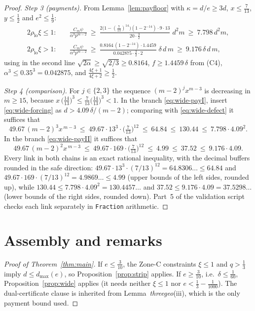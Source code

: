 \documentclass[11pt]{amsart}
\begin{document}
\begin{proof}
\emph{Step 3 (payments).}  From Lemma~\ref{lem:payfloor} with
$\kappa=d/e\ge3d$, $x\le\tfrac7{13}$, $y\le\tfrac12$ and $e^2\le\tfrac19$:
\begin{align}
 2\rho_{\mathrm{lo}}\xi\le1:\quad
 &\frac{C_m\psi}{\alpha^3p^{m-2}}\ \ge\
 \frac{2\bigl(1-(\tfrac7{13})^{14}\bigr)(1-2^{-14})\cdot9\cdot13}
      {20\cdot\tfrac32}\;d^2m\ \ge\ 7.798\,d^2m,
 \label{eq:wide-payI}\\
 2\rho_{\mathrm{lo}}\xi>1:\quad
 &\frac{C_m\psi}{\alpha^3p^{m-2}}\ \ge\
 \frac{0.8164\,(1-2^{-14})\cdot1.4459}
      {0.042875\cdot\tfrac32\cdot2}\;\delta\,d\,m\ \ge\ 9.176\,\delta\,d\,m,
 \label{eq:wide-payII}
\end{align}
using in the second line $\sqrt{2\alpha}\ge\sqrt{2/3}\ge0.8164$,
$f\ge1.4459\,\delta$ from (C4), $\alpha^3\le0.35^3=0.042875$, and
$\tfrac{4\xi+1}{4\xi+2}\ge\tfrac12$.

\emph{Step 4 (comparison).}  For $j\in\{2,3\}$ the sequence
$(m-2)^jx^{m-3}$ is decreasing in $m\ge15$, because
$x\,\bigl(\tfrac{14}{13}\bigr)^3\le\tfrac7{13}\bigl(\tfrac{14}{13}\bigr)^3
<1$.  In the branch \eqref{eq:wide-payI}, insert
\eqref{eq:wide-forcing} as $d>4.09\,\delta/(m-2)$; comparing with
\eqref{eq:wide-defect} it suffices that
\[
 49.67\,(m-2)^3x^{\,m-3}\ \le\ 49.67\cdot13^3\cdot
 \bigl(\tfrac7{13}\bigr)^{12}\ \le\ 64.84\ \le\ 130.44\ \le\
 7.798\cdot4.09^2 .
\]
In the branch \eqref{eq:wide-payII} it suffices that
\[
 49.67\,(m-2)^2x^{\,m-3}\ \le\ 49.67\cdot169\cdot
 \bigl(\tfrac7{13}\bigr)^{12}\ \le\ 4.99\ \le\ 37.52\ \le\
 9.176\cdot4.09 .
\]
Every link in both chains is an exact rational inequality, with the
decimal buffers rounded in the safe direction:
$49.67\cdot13^3\cdot(7/13)^{12}=64.8306\ldots\le64.84$ and
$49.67\cdot169\cdot(7/13)^{12}=4.9869\ldots\le4.99$ (upper bounds of the
left sides, rounded up), while $130.44\le7.798\cdot4.09^2=130.4457\ldots$
and $37.52\le9.176\cdot4.09=37.5298\ldots$ (lower bounds of the right
sides, rounded down).  Part~5 of the validation script checks each link
separately in \texttt{Fraction} arithmetic.
\end{proof}

\section{Assembly and remarks}\label{sec:assembly}

\begin{proof}[Proof of Theorem~\ref{thm:main}]
If $e\le\tfrac3{10}$, the Zone-C constraints $\xi\le1$ and $q>\tfrac13$
imply $d\le d_{\max}(e)$, so Proposition~\ref{prop:strip} applies.  If
$e\ge\tfrac3{10}$, i.e.\ $\delta\le\tfrac1{60}$,
Proposition~\ref{prop:wide} applies (it needs neither $\xi\le1$ nor
$e<\tfrac13-\tfrac1{1000}$).  The dual-certificate clause is inherited from
Lemma~\emph{threegeo}(iii), which is the only payment bound used.
\end{proof}
\end{document}
